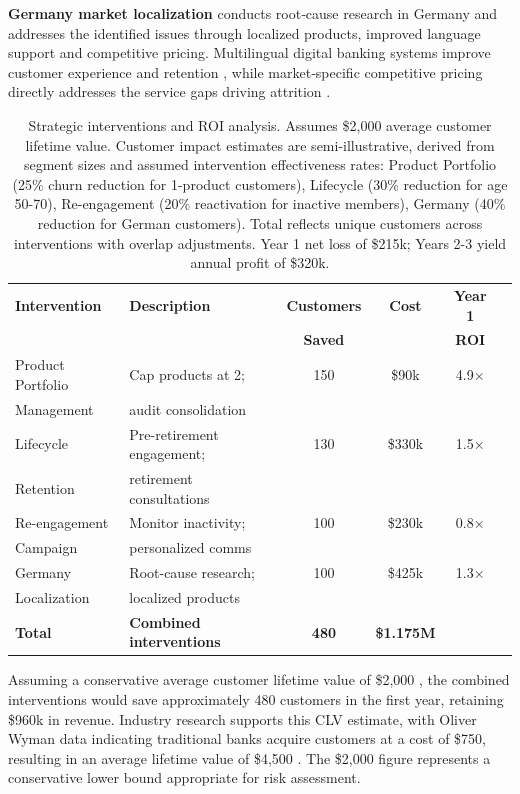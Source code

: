 \documentclass[12pt]{article}
\begin{document}
\textbf{Germany market localization} conducts root‑cause research in Germany and addresses the identified issues through localized products, improved language support and competitive pricing. Multilingual digital banking systems improve customer experience and retention \citep{hunsicker2023multilingual}, while market‑specific competitive pricing directly addresses the service gaps driving attrition \citep{smith2025switching}.

\begin{table}[H]
\centering
\small
\caption{Strategic interventions and ROI analysis. Assumes \$2,000 average customer lifetime value. Customer impact estimates are semi-illustrative, derived from segment sizes and assumed intervention effectiveness rates: Product Portfolio (25\% churn reduction for 1-product customers), Lifecycle (30\% reduction for age 50-70), Re-engagement (20\% reactivation for inactive members), Germany (40\% reduction for German customers). Total reflects unique customers across interventions with overlap adjustments. Year 1 net loss of \$215k; Years 2-3 yield annual profit of \$320k.}
\label{tab:roi_analysis}
\begin{tabular}{lp{5.5cm}cccc}
\toprule
\textbf{Intervention} & \textbf{Description} & \textbf{Customers} & \textbf{Cost} & \textbf{Year 1} \\
& & \textbf{Saved} & & \textbf{ROI} \\
\midrule
Product Portfolio & Cap products at 2; & 150 & \$90k & 4.9× \\
Management & audit consolidation & & & \\
\midrule
Lifecycle & Pre-retirement engagement; & 130 & \$330k & 1.5× \\
Retention & retirement consultations & & & \\
\midrule
Re-engagement & Monitor inactivity; & 100 & \$230k & 0.8× \\
Campaign & personalized comms & & & \\
\midrule
Germany & Root-cause research; & 100 & \$425k & 1.3× \\
Localization & localized products & & & \\
\midrule
\textbf{Total} & \textbf{Combined interventions} & \textbf{480} & \textbf{\$1.175M} & \\
\bottomrule
\end{tabular}
\end{table}

Assuming a conservative average customer lifetime value of \$2,000 \citep{meleis2010clv}, the combined interventions would save approximately 480 customers in the first year, retaining \$960k in revenue. Industry research supports this CLV estimate, with Oliver Wyman data indicating traditional banks acquire customers at a cost of \$750, resulting in an average lifetime value of \$4,500 \citep{chowdhry2019chime}. The \$2,000 figure represents a conservative lower bound appropriate for risk assessment.
\end{document}
